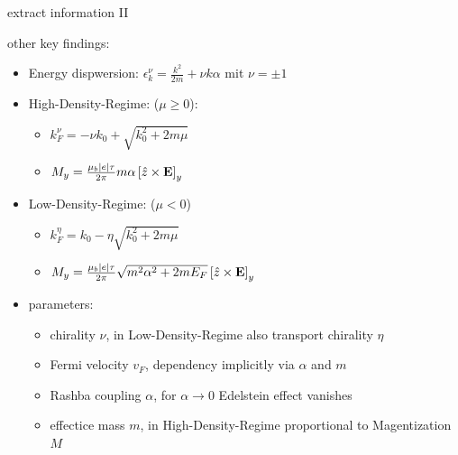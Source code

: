 \documentclass[t]{beamer}
\numberwithin{equation}{section}
\begin{document}
\begin{frame}[c]{extract information II}
\begin{minipage}[h]{0.11 \linewidth}
		\end{minipage}
		\hfill
		\begin{minipage}{0.84\linewidth}
			other key findings: 
			\begin{itemize}
				\item Energy dispwersion: $\epsilon_k^\nu = \frac{k^2}{2m} + \nu k \alpha$ mit $\nu = \pm 1$
				\item High-Density-Regime: ($\mu \geq 0$):
				\begin{itemize}
					\item $k_F^\nu = - \nu k_0 + \sqrt{k_0^2 + 2m\mu}$
					\item $M_y = \frac{\mu_b \abs{e} \tau}{2 \pi} m \alpha \left[\hat{z} \times \bold{E}\right]_y$
				\end{itemize}
				\item Low-Density-Regime: ($\mu < 0$)
				\begin{itemize}
					\item $k_F^\eta =k_0 - \eta \sqrt{k_0^2 + 2m\mu}$
					\item $M_y = \frac{\mu_b \abs{e} \tau}{2 \pi} \sqrt{m^2 \alpha^2 + 2m E_F} \left[\hat{z} \times \bold{E}\right]_y$
				\end{itemize}
				\item parameters:
				\begin{itemize}
					\item chirality $\nu$, in Low-Density-Regime also transport chirality $\eta$
					\item Fermi velocity $v_F$, dependency implicitly via $\alpha$ and $m$
					\item Rashba coupling $\alpha$, for $\alpha \rightarrow 0$ Edelstein effect vanishes
					\item effectice mass $m$, in High-Density-Regime proportional to Magentization $M$
				\end{itemize}
			\end{itemize}
		\end{minipage}
	\end{frame}
	
\end{document}
